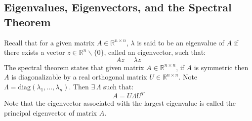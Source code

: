 \documentclass[twoside,twocolumn]{article}
\begin{document}
\subsection{Eigenvalues, Eigenvectors, and the Spectral Theorem}
Recall that for a given matrix $A\in \mathbb{R}^{n \times n}$, $\lambda$ is said
to be an eigenvalue of $A$ if there exists a vector
$z \in \mathbb{R}^n \backslash \{ 0 \}$, called an eigenvector, such that:
\begin{equation}
  Az=\lambda z
\end{equation}
The spectral theorem states that given matrix $A\in \mathbb{R}^{n \times n}$, if
$A$ is symmetric then $A$ is diagonalizable by a real orthogonal matrix
$U\in \mathbb{R}^{n \times n}$. Note
$\Lambda = \textrm{diag}(\lambda_1, \hdots, \lambda_n)$. Then $\exists \, \Lambda$
such that:
\begin{equation}
  A=U\Lambda U^T
\end{equation}
Note that the eigenvector associated with the largest eigenvalue is called the
principal eigenvector of matrix $A$.
\end{document}
